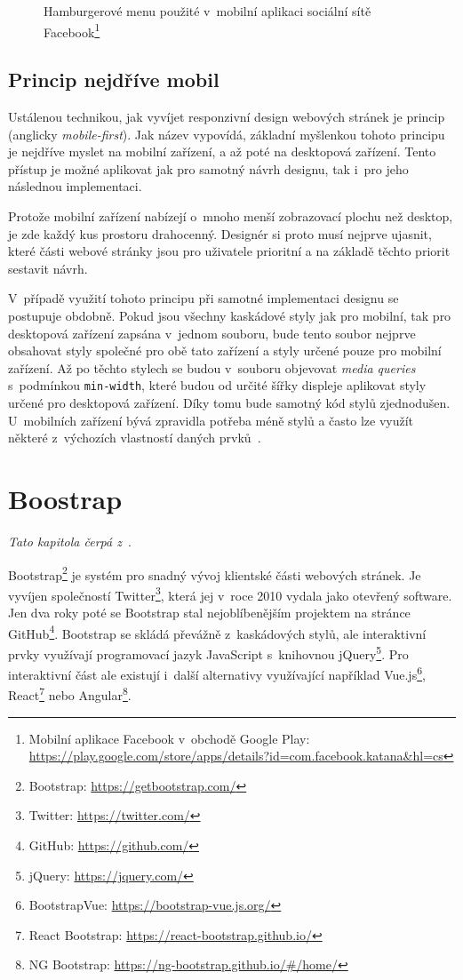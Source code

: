 \begin{figure}[H]
	\caption{Hamburgerové menu použité v~mobilní aplikaci sociální sítě Facebook\protect\footnote{Mobilní aplikace Facebook v~obchodě Google Play: \url{https://play.google.com/store/apps/details?id=com.facebook.katana&hl=cs}}}
\end{figure}



\subsection{Princip nejdříve mobil}\label{section:mobile-first}
Ustálenou technikou, jak vyvíjet responzivní design webových stránek je princip  (anglicky \emph{mobile-first}). Jak název vypovídá, základní myšlenkou tohoto principu je nejdříve myslet na mobilní zařízení, a až poté na desktopová zařízení. Tento přístup je možné aplikovat jak pro samotný návrh designu, tak i~pro jeho následnou implementaci.

Protože mobilní zařízení nabízejí o~mnoho menší zobrazovací plochu než desktop, je zde každý kus prostoru drahocenný. Designér si proto musí nejprve ujasnit, které části webové stránky jsou pro uživatele prioritní a na základě těchto priorit sestavit návrh.

V~případě využití tohoto principu při samotné implementaci designu se postupuje obdobně. Pokud jsou všechny kaskádové styly jak pro mobilní, tak pro desktopová zařízení zapsána v~jednom souboru, bude tento soubor nejprve obsahovat styly společné pro obě tato zařízení a styly určené pouze pro mobilní zařízení. Až po těchto stylech se budou v~souboru objevovat \emph{media queries} s~podmínkou \texttt{min-width}, které budou od určité šířky displeje aplikovat styly určené pro desktopová zařízení. Díky tomu bude samotný kód stylů zjednodušen. U~mobilních zařízení bývá zpravidla potřeba méně stylů a často lze využít některé z~výchozích vlastností daných prvků~\cite{bib:mobile-first}.


\section{Boostrap}
\emph{Tato kapitola čerpá z~\cite{bib:bootstrap}}.

Bootstrap\footnote{Bootstrap: \url{https://getbootstrap.com/}} je systém pro snadný vývoj klientské části webových stránek. Je vyvíjen společností Twitter\footnote{Twitter: \url{https://twitter.com/}}, která jej v~roce 2010 vydala jako otevřený software. Jen dva roky poté se Bootstrap stal nejoblíbenějším projektem na stránce GitHub\footnote{GitHub: \url{https://github.com/}}. Bootstrap se skládá převážně z~kaskádových stylů, ale interaktivní prvky využívají programovací jazyk JavaScript s~knihovnou jQuery\footnote{jQuery: \url{https://jquery.com/}}. Pro interaktivní část ale existují i~další alternativy využívající například Vue.js\footnote{BootstrapVue: \url{https://bootstrap-vue.js.org/}}, React\footnote{React Bootstrap: \url{https://react-bootstrap.github.io/}} nebo Angular\footnote{NG Bootstrap: \url{https://ng-bootstrap.github.io/\#/home/}}.


